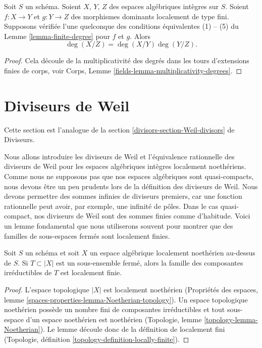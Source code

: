 \begin{lemma}
\label{lemma-degree-composition}
Soit $S$ un schéma.
Soient $X$, $Y$, $Z$ des espaces algébriques intègres sur $S$.
Soient $f : X \to Y$ et $g : Y \to Z$ des morphismes dominants localement
de type fini. Supposons vérifiée l'une quelconque des conditions équivalentes
(1) -- (5) du Lemme \ref{lemma-finite-degree} pour $f$ et $g$. Alors
$$
\deg(X/Z) = \deg(X/Y) \deg(Y/Z).
$$
\end{lemma}

\begin{proof}
Cela découle de la multiplicativité des degrés dans les tours
d'extensions finies de corps, voir
Corps, Lemme \ref{fields-lemma-multiplicativity-degrees}.
\end{proof}










\section{Diviseurs de Weil}
\label{section-Weil-divisors}

\noindent
Cette section est l'analogue de la section
\ref{divisors-section-Weil-divisors} de Diviseurs.

\medskip\noindent
Nous allons introduire les diviseurs de Weil et l'équivalence rationnelle des
diviseurs de Weil pour les espaces algébriques intègres localement noethériens.
Comme nous ne supposons pas que nos espaces algébriques sont quasi-compacts, nous devons
être un peu prudents lors de la définition des diviseurs de Weil. Nous devons permettre
des sommes infinies de diviseurs premiers, car une fonction rationnelle peut avoir,
par exemple, une infinité de pôles. Dans le cas quasi-compact, nos diviseurs
de Weil sont des sommes finies comme d'habitude. Voici un lemme fondamental que nous
utiliserons souvent pour montrer que des familles de sous-espaces fermés sont localement finies.

\begin{lemma}
\label{lemma-components-locally-finite}
Soit $S$ un schéma et soit $X$ un espace algébrique localement noethérien
au-dessus de $S$. Si $T \subset |X|$ est un sous-ensemble fermé,
alors la famille des composantes irréductibles de $T$ est localement finie.
\end{lemma}

\begin{proof}
L'espace topologique $|X|$ est localement noethérien
(Propriétés des espaces, lemme \ref{spaces-properties-lemma-Noetherian-topology}).
Un espace topologique noethérien possède un nombre fini de
composantes irréductibles et tout sous-espace d'un espace noethérien est noethérien
(Topologie, lemme \ref{topology-lemma-Noetherian}).
Le lemme découle donc de la définition de localement fini
(Topologie, définition \ref{topology-definition-locally-finite}).
\end{proof}

